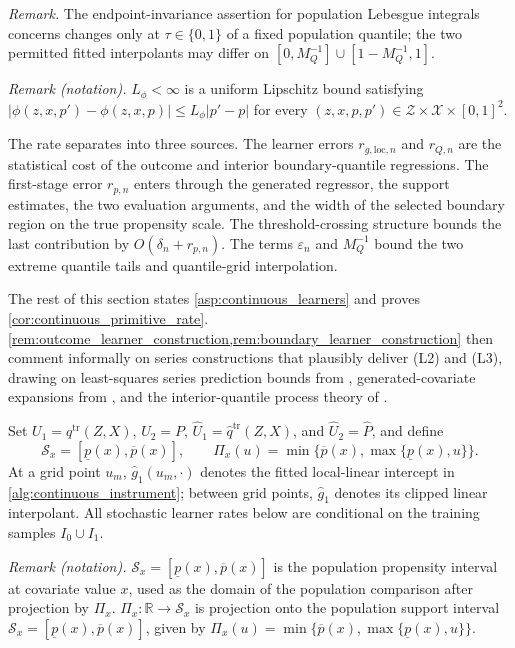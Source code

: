 \noindent\textit{Remark.} The endpoint-invariance assertion for population Lebesgue integrals concerns changes only at $\tau\in\{0,1\}$ of a fixed population quantile; the two permitted fitted interpolants may differ on $[0,M_Q^{-1}]\cup[1-M_Q^{-1},1]$.

\noindent\textit{Remark (notation).} $L_\phi<\infty$ is a uniform Lipschitz bound satisfying $|\phi(z,x,p')-\phi(z,x,p)|\leqslant L_\phi|p'-p|$ for every $(z,x,p,p')\in\mathcal Z\times\mathcal X\times[0,1]^2$.


The rate separates into three sources. The learner errors $r_{g,\mathrm{loc},n}$ and $r_{Q,n}$ are the statistical cost of the outcome and interior boundary-quantile regressions. The first-stage error $r_{p,n}$ enters through the generated regressor, the support estimates, the two evaluation arguments, and the width of the selected boundary region on the true propensity scale. The threshold-crossing structure bounds the last contribution by $O(\delta_n+r_{p,n})$. The terms $\varepsilon_n$ and $M_Q^{-1}$ bound the two extreme quantile tails and quantile-grid interpolation. 

The rest of this section states \cref{asp:continuous_learners} and proves \cref{cor:continuous_primitive_rate}. \cref{rem:outcome_learner_construction,rem:boundary_learner_construction} then comment informally on series constructions that plausibly deliver (L2) and (L3), drawing on least-squares series prediction bounds from \citet{belloni2015series}, generated-covariate expansions from \citet{mammen_rothe_schienle2012,lee2018partial_mean}, and the interior-quantile process theory of \citet{belloni2019conditional}.

Set $U_1=q^{\mathrm{tr}}(Z,X)$, $U_2=P$, $\hat U_1=\hat q^{\mathrm{tr}}(Z,X)$, and $\hat U_2=\hat P$, and define
\[
    \mathcal S_x=[\underline p(x),\overline p(x)],
    \qquad
    \Pi_x(u)=\min\{\overline p(x),\max\{\underline p(x),u\}\}.
\]
At a grid point $u_m$, $\hat g_1(u_m,\cdot)$ denotes the fitted local-linear intercept in \cref{alg:continuous_instrument}; between grid points, $\hat g_1$ denotes its clipped linear interpolant. All stochastic learner rates below are conditional on the training samples $I_0\cup I_1$.

\noindent\textit{Remark (notation).} $\mathcal S_x=[\underline p(x),\overline p(x)]$ is the population propensity interval at covariate value $x$, used as the domain of the population comparison after projection by $\Pi_x$. $\Pi_x:\mathbb R\to\mathcal S_x$ is projection onto the population support interval $\mathcal S_x=[\underline p(x),\overline p(x)]$, given by $\Pi_x(u)=\min\{\overline p(x),\max\{\underline p(x),u\}\}$.



